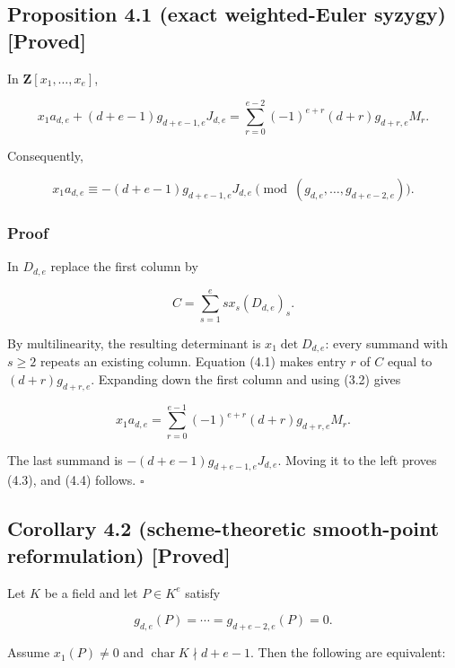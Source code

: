 \documentclass[
]{article}
\begin{document}
\subsection*{Proposition 4.1 (exact weighted-Euler syzygy)
{[}Proved{]}}\label{proposition-4.1-exact-weighted-euler-syzygy-proved}

In \(\mathbf Z[x_1,\ldots,x_e]\),

\[
\boxed{
x_1a_{d,e}+(d+e-1)g_{d+e-1,e}J_{d,e}
=\sum_{r=0}^{e-2}(-1)^{e+r}(d+r)g_{d+r,e}M_r.}
\tag{4.3}
\]

Consequently,

\[
x_1a_{d,e}\equiv
-(d+e-1)g_{d+e-1,e}J_{d,e}
\pmod{(g_{d,e},\ldots,g_{d+e-2,e})}.
\tag{4.4}
\]

\subsubsection*{Proof}\label{proof-3}

In \(D_{d,e}\) replace the first column by

\[
C=\sum_{s=1}^e sx_s(D_{d,e})_s.
\]

By multilinearity, the resulting determinant is \(x_1\det D_{d,e}\):
every summand with \(s\ge2\) repeats an existing column. Equation (4.1)
makes entry \(r\) of \(C\) equal to \((d+r)g_{d+r,e}\). Expanding down
the first column and using (3.2) gives

\[
x_1a_{d,e}=\sum_{r=0}^{e-1}
(-1)^{e+r}(d+r)g_{d+r,e}M_r.
\]

The last summand is \(-(d+e-1)g_{d+e-1,e}J_{d,e}\). Moving it to the
left proves (4.3), and (4.4) follows. \(\square\)

\subsection*{Corollary 4.2 (scheme-theoretic smooth-point reformulation)
{[}Proved{]}}\label{corollary-4.2-scheme-theoretic-smooth-point-reformulation-proved}

Let \(K\) be a field and let \(P\in K^e\) satisfy

\[
g_{d,e}(P)=\cdots=g_{d+e-2,e}(P)=0.
\]

Assume \(x_1(P)\ne0\) and \(\operatorname{char}K\nmid d+e-1\). Then the
following are equivalent:
\end{document}
